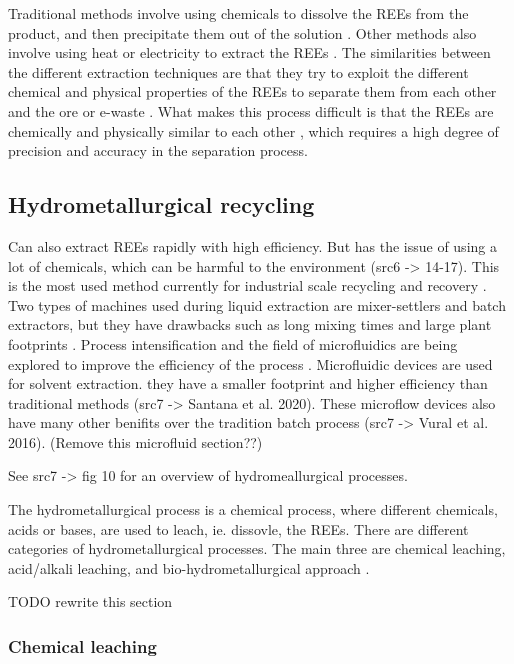 Traditional methods involve using chemicals to dissolve the REEs from the product, and then precipitate them out of the solution \cite{sanchez2024}. Other methods also involve using heat or electricity to extract the REEs \cite{sanchez2024}. The similarities between the different extraction techniques are that they try to exploit the different chemical and physical properties of the REEs to separate them from each other and the ore or e-waste \cite{sanchez2024}. What makes this process difficult is that the REEs are chemically and physically similar to each other \cite{britannica2024}, which requires a high degree of precision and accuracy in the separation process.

\subsection{Hydrometallurgical recycling}

Can also extract REEs rapidly with high efficiency. But has the issue of using a lot of chemicals, which can be harmful to the environment (src6 -> 14-17). This is the most used method currently for industrial scale recycling and recovery \cite{javed2024}. Two types of machines used during liquid extraction are mixer-settlers and batch extractors, but they have drawbacks such as long mixing times and large plant footprints \cite{javed2024}. Process intensification and the field of microfluidics are being explored to improve the efficiency of the process \cite{javed2024}. Microfluidic devices are used for solvent extraction. they have a smaller footprint and higher efficiency than traditional methods (src7 -> Santana et al. 2020). These microflow devices also have many other benifits over the tradition batch process (src7 -> Vural et al. 2016). (Remove this microfluid section??)

See src7 -> fig 10 for an overview of hydromeallurgical processes.

The hydrometallurgical process is a chemical process, where different chemicals, acids or bases, are used to leach, ie. dissovle, the REEs. There are different categories of hydrometallurgical processes. The main three are chemical leaching, acid/alkali leaching, and bio-hydrometallurgical approach \cite{javed2024}. 

TODO rewrite this section

\subsubsection{Chemical leaching}

